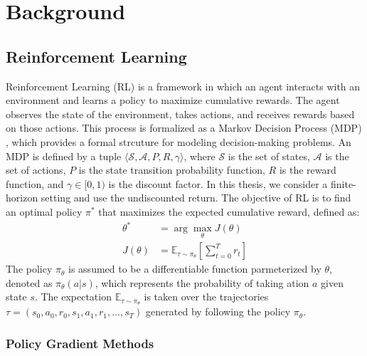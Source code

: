 
\chapter{Background}\label{chapter2}

\section{Reinforcement Learning} \label{chap2:sec1}

Reinforcement Learning (RL) is a framework in which an agent interacts with an environment and learns a policy to maximize cumulative rewards.
The agent observes the state of the environment, takes actions, and receives rewards based on those actions.
This process is formalized as a Markov Decision Process (MDP) \cite{MDP}, which provides a formal strcuture for modeling decision-making problems.
An MDP is defined by a tuple $\langle \mathcal{S}, \mathcal{A}, P, R, \gamma \rangle$, where $\mathcal{S}$ is the set of states, $\mathcal{A}$ is the set of actions, $P$ is the state transition probability function, $R$ is the reward function, and $\gamma \in [0, 1)$ is the discount factor.
In this thesis, we consider a finite-horizon setting and use the undiscounted return.
The objective of RL is to find an optimal policy $\pi^*$ that maximizes the expected cumulative reward, defined as:
\begin{equation}
  \begin{aligned}
    \theta^* &= \arg\max_\theta J(\theta) \\
    J(\theta) &= \mathbb{E}_{\tau \sim \pi_\theta} \left[\sum^T_{t = 0} r_t \right]
  \end{aligned}
\end{equation}
The policy $\pi_\theta$ is assumed to be a differentiable function parmeterized by $\theta$, denoted as $\pi_\theta(a|s)$, which represents the probability of taking ation $a$ given state $s$.
The expectation $\mathbb{E}_{\tau \sim \pi_\theta}$ is taken over the trajectories $\tau = (s_0, a_0, r_0, s_1, a_1, r_1, \ldots, s_T)$ generated by following the policy $\pi_\theta$.


\subsection{Policy Gradient Methods} \label{chap2:sec2}

